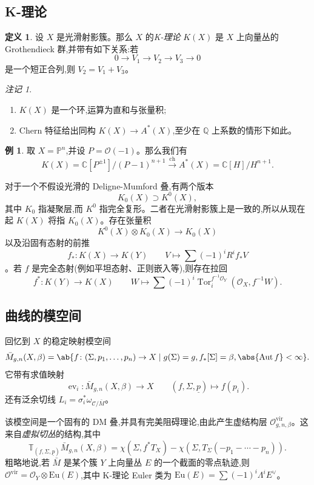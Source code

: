 \documentclass{amsart}
\theoremstyle{definition}
\newtheorem{defn}[thm]{定义}
\newtheorem{exm}[thm]{例}
\theoremstyle{remark}
\newtheorem{rmk}[thm]{注记}
\theoremstyle{plain}
\theoremstyle{definition}
\theoremstyle{remark}
\newcommand{\C}{\mathbb{C}}
\newcommand{\Q}{\mathbb{Q}}
\renewcommand{\P}{\mathbb{P}}
\newcommand{\mc}[1]{\mathcal{#1}}
\newcommand{\mr}[1]{\mathrm{#1}}
\newcommand{\on}[1]{\operatorname{#1}}
\newcommand{\ul}[1]{\underline{#1}}
\newcommand{\1}{\mathbf{1}}
\newcommand{\2}{\mathbf{2}}
\newcommand{\3}{\mathbf{3}}
\newcommand{\vir}{\mr{vir}}
\DeclareMathOperator{\Aut}{Aut}
\DeclareMathOperator{\ev}{ev}
\begin{document}
\subsection{K-理论}%
\label{sub:K-theory}

\begin{defn}
    设 \(X\) 是光滑射影簇。那么 \(X\) 的\textit{K-理论} \(K(X)\) 是 \(X\) 上向量丛的 Grothendieck 群,并带有如下关系:若
    \[ 0 \to V_1 \to V_2 \to V_3 \to 0 \]
    是一个短正合列,则 \(V_2 = V_1 + V_3\)。
\end{defn}

\begin{rmk}\leavevmode
    \begin{enumerate}
        \item \(K(X)\) 是一个环,运算为直和与张量积;
        \item Chern 特征给出同构 \(K(X) \to A^*(X)\),至少在 \(\Q\) 上系数的情形下如此。
    \end{enumerate}
\end{rmk}

\begin{exm}
    取 \(X = \P^n\),并设 \(P = \mc{O}(-1)\)。那么我们有
    \[ K(X) = \C[P^{\pm 1}]/(P-1)^{n+1} \xrightarrow{\on{ch}} A^*(X) = \C[H]/H^{n+1}. \]
\end{exm}

对于一个不假设光滑的 Deligne-Mumford 叠,有两个版本
\[ K_0(X) \supset K^0(X), \]
其中 \(K_0\) 指凝聚层,而 \(K^0\) 指完全复形。二者在光滑射影簇上是一致的,所以从现在起 \(K(X)\) 将指 \(K_0(X)\)。存在张量积
\[ K^0(X) \otimes K_0(X) \to K_0(X) \]
以及沿固有态射的前推
\[ f_* \colon K(X) \to K(Y) \qquad V \mapsto \sum (-1)^i R^i f_* V \]
。若 \(f\) 是完全态射(例如平坦态射、正则嵌入等),则存在拉回
\[ f^* \colon K(Y) \to K(X) \qquad W \mapsto \sum (-1)^i \on{Tor}_i^{f^{-1} \mc{O}_Y} (\mc{O}_X, f^{-1} W). \]

\subsection{曲线的模空间}%
\label{sub:Moduli of curves}

回忆到 \(X\) 的稳定映射模空间
\[ \bar{M}_{g,n}(X, \beta) = \ab\{ f \colon (\Sigma, p_1, \ldots, p_n) \to X \mid g(\Sigma) = g, f_*[\Sigma] = \beta, \abs{\Aut f} < \infty \}. \]
它带有求值映射
\[ \ev_i \colon \bar{M}_{g,n}(X, \beta) \to X \qquad (f, \Sigma, \ul{p}) \mapsto f(p_i). \]
还有泛余切线 \(L_i = \sigma_i^* \omega_{ \mc{C}/\bar{M} }\)。

该模空间是一个固有的 DM 叠,并具有完美阻碍理论,由此产生虚结构层 \(\mc{O}^{\vir}_{g,n,\beta}\)。这来自\textit{虚拟切丛}的结构,其中
\[ \mathbb{T}_{(f, \Sigma, \ul{p})} \bar{M}_{g,n}(X, \beta) = \chi(\Sigma, f^* T_X) - \chi(\Sigma, T_{\Sigma}(-p_1 - \cdots - p_n)). \]
粗略地说,若 \(\bar{M}\) 是某个簇 \(Y\) 上向量丛 \(E\) 的一个截面的零点轨迹,则 \(\mc{O}^{\vir} = \mc{O}_Y \otimes \mr{Eu}(E)\),其中 K-理论 Euler 类为 \(\mr{Eu}(E) = \sum (-1)^i \Lambda^i E^{\vee}\)。
\end{document}
